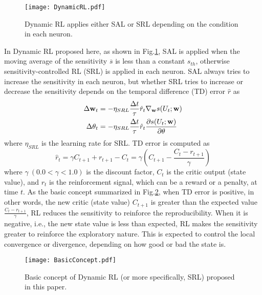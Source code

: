 \begin{figure}[t]
\centerline{\texttt{[image: DynamicRL.pdf]}}
\caption{Dynamic RL applies either SAL or SRL depending on the condition in each neuron.}
\label{fig:DynamicRL}
\end{figure}
In Dynamic RL proposed here, as shown in Fig.\ref{fig:DynamicRL},
SAL is applied when the moving average of the sensitivity $\overline{s}$
is less than a constant $s_{th}$, otherwise sensitivity-controlled RL (SRL) is applied in each neuron.
SAL always tries to increase the sensitivity in each neuron,
but whether SRL tries to increase or decrease the sensitivity depends on the temporal difference (TD) error ${\hat r}$ as
\begin{align}
\Delta {\bf w}_t &= -\eta_{SRL}\frac{\Delta t}{\tau} \hat{r}_t \nabla_{\bf w} s(U_t; {\bf w})\\
\Delta \theta_t &= -\eta_{SRL}\frac{\Delta t}{\tau} \hat{r}_t \frac{\partial s(U_t; {\bf w})}{\partial \theta}
\end{align}
where $\eta_{SRL}$ is the learning rate for SRL.
TD error is computed as
\begin{equation}
\hat{r}_t = \gamma C_{t+1} + r_{t+1} - C_t = \gamma\left(C_{t+1}-\frac{C_t-r_{t+1}}{\gamma}\right)
\label{Eq:TDerr}
\end{equation}
where $\gamma\ (0.0<\gamma<1.0)$ is the discount factor, $C_t$ is the critic output (state value),
and $r_t$ is the reinforcement signal, which can be a reward or a penalty, at time $t$.
As the basic concept summarized in Fig.\ref{fig:BasicConcept},
when TD error is positive, in other words, the new critic (state value) $C_{t+1}$ is greater than the expected value
$\frac{C_t-r_{t+1}}{\gamma}$,
RL reduces the sensitivity to reinforce the reproducibility.
When it is negative, i.e., the new state value is less than expected,
RL makes the sensitivity greater to reinforce the exploratory nature.
This is expected to control the local convergence or divergence, depending on how good or bad the state is.

\begin{figure}[ht]
\centerline{\texttt{[image: BasicConcept.pdf]}}
\caption{Basic concept of Dynamic RL (or more specifically, SRL) proposed in this paper.}
\label{fig:BasicConcept}
\end{figure}

